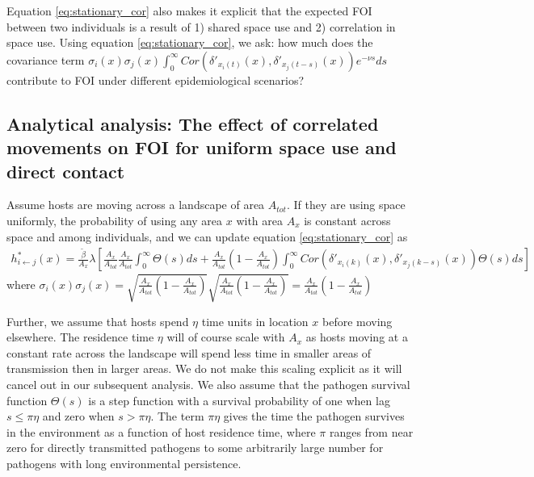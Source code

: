 \documentclass[letterpaper]{article}
\begin{document}
Equation \ref{eq:stationary_cor} also makes it explicit that the expected FOI between two individuals is a result of 1) shared space use and 2) correlation in space use. Using equation \ref{eq:stationary_cor}, we ask: how much does the covariance term $\sigma_i(x) \sigma_j(x) \int_{0}^{\infty} Cor(\delta'_{x_i(t)}(x), \delta'_{x_j(t - s)}(x)) e^{-\nu s} ds$ contribute to FOI under different epidemiological scenarios?

\subsection*{Analytical analysis: The effect of correlated movements on FOI for uniform space use and direct contact}

Assume hosts are moving across a landscape of area $A_{tot}$. %
If they are using space uniformly, the probability of using any area $x$ with area $A_x$ is constant across space and among individuals, and we can update equation \ref{eq:stationary_cor} as
\begin{equation}
    \begin{aligned}
    h^*_{i \leftarrow j}(x) = \frac{\tilde\beta}{A_x} \lambda \left[ \frac{A_x}{A_{tot}}\frac{A_x}{A_{tot}} \int_{0}^{\infty} \Theta(s) ds + \frac{A_x}{A_{tot}} \left(1 - \frac{A_x}{A_{tot}}\right) \int_{0}^{\infty} Cor(\delta'_{x_i(k)}(x), \delta'_{x_j(k - s)}(x)) \Theta(s) ds\right]
    \end{aligned}
    \label{eq:stationary_uniform}
\end{equation}
where  $\sigma_i(x) \sigma_j(x) = \sqrt{\frac{A_x}{A_{tot}}(1 - \frac{A_x}{A_{tot}})}\sqrt{\frac{A_x}{A_{tot}}(1 - \frac{A_x}{A_{tot}})} = \frac{A_x}{A_{tot}}(1 - \frac{A_x}{A_{tot}})$

Further, we assume that hosts spend $\eta$ time units in location $x$ before moving elsewhere.  The residence time $\eta$ will of course scale with $A_x$ as hosts moving at a constant rate across the landscape will spend less time in smaller areas of transmission then in larger areas.  We do not make this scaling explicit as it will cancel out in our subsequent analysis. We also assume that the pathogen survival function $\Theta(s)$ is a step function with a survival probability of one when lag $s \leq \pi \eta$ and zero when $s > \pi \eta$. 
The term $\pi \eta$ gives the time the pathogen survives in the environment as a function of host residence time, where $\pi$ ranges from near zero for directly transmitted pathogens to some arbitrarily large number for pathogens with long environmental persistence.  
\end{document}
